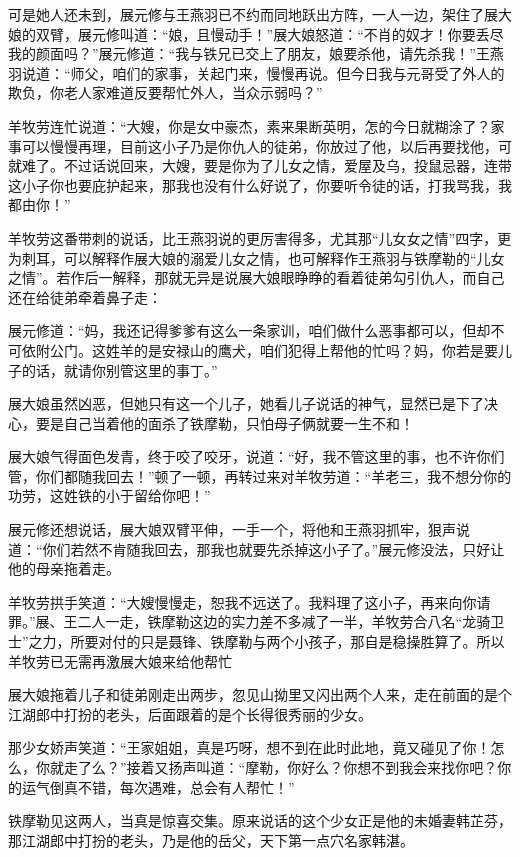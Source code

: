 \documentclass[12pt,oneside]{book}
\begin{document}
可是她人还未到，展元修与王燕羽已不约而同地跃出方阵，一人一边，架住了展大娘的双臂，展元修叫道：``娘，且慢动手！''展大娘怒道：``不肖的奴才！你要丢尽我的颜面吗？''展元修道：``我与铁兄已交上了朋友，娘要杀他，请先杀我！''王燕羽说道：``师父，咱们的家事，关起门来，慢慢再说。但今日我与元哥受了外人的欺负，你老人家难道反要帮忙外人，当众示弱吗？''

羊牧劳连忙说道：``大嫂，你是女中豪杰，素来果断英明，怎的今日就糊涂了？家事可以慢慢再理，目前这小子乃是你仇人的徒弟，你放过了他，以后再要找他，可就难了。不过话说回来，大嫂，要是你为了儿女之情，爱屋及乌，投鼠忌器，连带这小子你也要庇护起来，那我也没有什么好说了，你要听令徒的话，打我骂我，我都由你！''

羊牧劳这番带刺的说话，比王燕羽说的更厉害得多，尤其那``儿女女之情''四字，更为刺耳，可以解释作展大娘的溺爱儿女之情，也可解释作王燕羽与铁摩勒的``儿女之情''。若作后一解释，那就无异是说展大娘眼睁睁的看着徒弟勾引仇人，而自己还在给徒弟牵着鼻子走：

展元修道：``妈，我还记得爹爹有这么一条家训，咱们做什么恶事都可以，但却不可依附公门。这姓羊的是安禄山的鹰犬，咱们犯得上帮他的忙吗？妈，你若是要儿子的话，就请你别管这里的事丁。''

展大娘虽然凶恶，但她只有这一个儿子，她看儿子说话的神气，显然已是下了决心，要是自己当着他的面杀了铁摩勒，只怕母子俩就要一生不和！

展大娘气得面色发青，终于咬了咬牙，说道：``好，我不管这里的事，也不许你们管，你们都随我回去！''顿了一顿，再转过来对羊牧劳道：``羊老三，我不想分你的功劳，这姓铁的小于留给你吧！''

展元修还想说话，展大娘双臂平伸，一手一个，将他和王燕羽抓牢，狠声说道：``你们若然不肯随我回去，那我也就要先杀掉这小子了。''展元修没法，只好让他的母亲拖着走。

羊牧劳拱手笑道：``大嫂慢慢走，恕我不远送了。我料理了这小子，再来向你请罪。''展、王二人一走，铁摩勒这边的实力差不多减了一半，羊牧劳合八名``龙骑卫士''之力，所要对付的只是聂锋、铁摩勒与两个小孩子，那自是稳操胜算了。所以羊牧劳已无需再激展大娘来给他帮忙

展大娘拖着儿子和徒弟刚走出两步，忽见山拗里又闪出两个人来，走在前面的是个江湖郎中打扮的老头，后面跟着的是个长得很秀丽的少女。

那少女娇声笑道：``王家姐姐，真是巧呀，想不到在此时此地，竟又碰见了你！怎么，你就走了么？''接着又扬声叫道：``摩勒，你好么？你想不到我会来找你吧？你的运气倒真不错，每次遇难，总会有人帮忙！''

铁摩勒见这两人，当真是惊喜交集。原来说话的这个少女正是他的未婚妻韩芷芬，那江湖郎中打扮的老头，乃是他的岳父，天下第一点穴名家韩湛。
\end{document}
